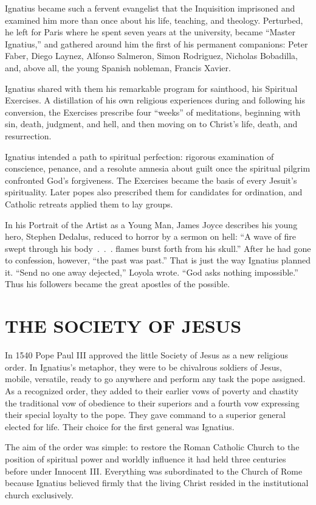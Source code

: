 Ignatius became such a fervent evangelist that the Inquisition imprisoned and examined him more than
once about his life, teaching, and theology. Perturbed, he left for Paris where he spent seven years
at the university, became “Master Ignatius,” and gathered around him the first of his permanent
companions: Peter Faber, Diego Laynez, Alfonso Salmeron, Simon Rodriguez, Nicholas Bobadilla, and,
above all, the young Spanish nobleman, Francis Xavier.

Ignatius shared with them his remarkable program for sainthood, his Spiritual Exercises. A
distillation of his own religious experiences during and following his conversion, the Exercises
prescribe four “weeks” of meditations, beginning with sin, death, judgment, and hell, and then
moving on to Christ’s life, death, and resurrection.

Ignatius intended a path to spiritual perfection: rigorous examination of conscience, penance, and a
resolute amnesia about guilt once the spiritual pilgrim confronted God’s forgiveness. The Exercises
became the basis of every Jesuit’s spirituality. Later popes also prescribed them for candidates for
ordination, and Catholic retreats applied them to lay groups.

In his Portrait of the Artist as a Young Man, James Joyce describes his young hero, Stephen Dedalus,
reduced to horror by a sermon on hell: “A wave of fire swept through his body~.~.~. flames burst
forth from his skull.” After he had gone to confession, however, “the past was past.” That is just
the way Ignatius planned it. “Send no one away dejected,” Loyola wrote. “God asks nothing
impossible.” Thus his followers became the great apostles of the possible.

\section{THE SOCIETY OF JESUS}

In 1540 Pope Paul III approved the little Society of Jesus as a new religious order. In Ignatius’s
metaphor, they were to be chivalrous soldiers of Jesus, mobile, versatile, ready to go anywhere and
perform any task the pope assigned. As a recognized order, they added to their earlier vows of
poverty and chastity the traditional vow of obedience to their superiors and a fourth vow expressing
their special loyalty to the pope. They gave command to a superior general elected for life. Their
choice for the first general was Ignatius.

The aim of the order was simple: to restore the Roman Catholic Church to the position of spiritual
power and worldly influence it had held three centuries before under Innocent III. Everything was
subordinated to the Church of Rome because Ignatius believed firmly that the living Christ resided
in the institutional church exclusively.

